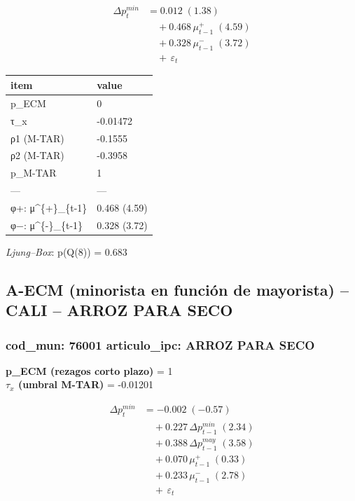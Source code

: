 \documentclass[
  12pt,
]{article}
\begin{document}
\[
\begin{aligned}
\Delta p^{min}_{t} &= 0.012\;(1.38) \\
&\quad + 0.468\,\mu^{+}_{t-1}\;(4.59) \\
&\quad + 0.328\,\mu^{-}_{t-1}\;(3.72) \\
&\quad +\, \varepsilon_t
\end{aligned}
\]

\begin{longtable}[t]{ll}
\toprule
item & value\\
\midrule
p\_ECM & 0\\
τ\_x & -0.01472\\
ρ1 (M-TAR) & -0.1555\\
ρ2 (M-TAR) & -0.3958\\
p\_M-TAR & 1\\
\addlinespace
— & —\\
φ+: μ\textasciicircum{}\{+\}\_\{t-1\} & 0.468 (4.59)\\
φ−: μ\textasciicircum{}\{-\}\_\{t-1\} & 0.328 (3.72)\\
\bottomrule
\end{longtable}

\emph{Ljung--Box}: p(Q(8)) = 0.683

\subsection{A-ECM (minorista en función de mayorista) -- CALI -- ARROZ
PARA
SECO}\label{a-ecm-minorista-en-funciuxf3n-de-mayorista-cali-arroz-para-seco}

\subsubsection{cod\_mun: 76001 \textbar{} articulo\_ipc: ARROZ PARA
SECO}\label{cod_mun-76001-articulo_ipc-arroz-para-seco}

\textbf{p\_ECM (rezagos corto plazo)} = 1\\
\textbf{\(\tau_x\) (umbral M-TAR)} = -0.01201

\[
\begin{aligned}
\Delta p^{min}_{t} &= -0.002\;(-0.57) \\
&\quad + 0.227\,\Delta p^{min}_{t-1}\;(2.34) \\
&\quad + 0.388\,\Delta p^{may}_{t-1}\;(3.58) \\
&\quad + 0.070\,\mu^{+}_{t-1}\;(0.33) \\
&\quad + 0.233\,\mu^{-}_{t-1}\;(2.78) \\
&\quad +\, \varepsilon_t
\end{aligned}
\]
\end{document}

